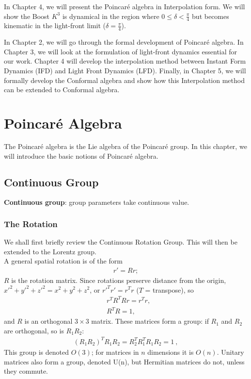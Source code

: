 \documentclass[12pt,a4paper]{report}
\begin{document}
	In Chapter 4, we will present the Poincaré algebra in Interpolation form. We will show the Boost $K^{3}$ is dynamical in the region where $0\leq\delta<\frac{\pi}{4}$ but becomes kinematic in the light-front limit ($\delta=\frac{\pi}{4}$).
	
	In Chapter 2, we will go through the formal development of Poincaré algebra. In Chapter 3, we will look at the formulation of light-front dynamics essential for our work. Chapter 4 will develop the interpolation method between Instant Form Dynamics (IFD) and Light Front Dynamics (LFD). Finally, in Chapter 5, we will formally develop the Conformal algebra and show how this Interpolation method can be extended to Conformal algebra.

\chapter{Poincaré Algebra}
The Poincaré algebra is the Lie algebra of the Poincaré group. In this chapter, we will introduce the basic notions of Poincaré algebra.
\section{Continuous Group}

\textbf{Continuous group}: group parameters take continuous value.
\subsection{The Rotation}
We shall first briefly review the Continuous Rotation Group. This will then be extended to the Lorentz group.\cite{Hitoshi, Ryder, balki}\\
A general spatial rotation is of the form
\begin{align}
    r'=Rr;
\end{align}
$R$ is the rotation matrix. Since rotations perserve distance from the origin, $x'^2 + y'^2 + z'^2 = x^2 + y^2 + z^2$, or $r'^Tr' = r^Tr$ ($T$ = transpose), so 
\begin{align}
    &r^TR^TRr=r^Tr,\\
    &R^TR=1,\label{RR}
\end{align}
and $R$ is an orthogonal $3\times3$ matrix. These matrices form a group: if $R_1$ and $R_2$ are orthogonal, so is $R_1R_2$:
\begin{align}
    (R_1R_2)^TR_1R_2=R_2^TR_1^TR_1R_2=1~,
\end{align}
This group is denoted $O(3)$; for matrices in $n$ dimensions it is $O(n)$. Unitary matrices also form a group, denoted U(n), but Hermitian matrices do not, unless they commute.
\end{document}
